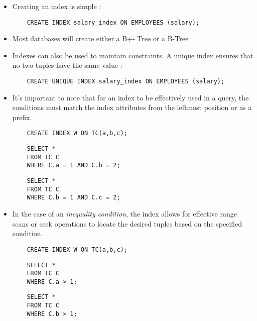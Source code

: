 \begin{itemize}
    \item Creating an index is simple :
    \begin{verbatim}
    CREATE INDEX salary_index ON EMPLOYEES (salary);
    \end{verbatim}
    \item Most databases will create either a B+- Tree or a B-Tree
    \item Indexes can also be used to maintain constraints. A unique index ensures that no two tuples have the same value :
    \begin{verbatim}
    CREATE UNIQUE INDEX salary_index ON EMPLOYEES (salary);
    \end{verbatim}
    \item It's important to note that for an index to be effectively used in a query, the conditions must match the index attributes from the leftmost position or as a prefix.
    \begin{verbatim}
    CREATE INDEX W ON TC(a,b,c);
    \end{verbatim}
    \begin{minipage}[t]{0.4\textwidth}
    \begin{verbatim}
    SELECT *
    FROM TC C
    WHERE C.a = 1 AND C.b = 2;
    \end{verbatim}
    \end{minipage}
    \hfill
    \begin{minipage}[t]{0.4\textwidth}
    \begin{verbatim}
    SELECT *
    FROM TC C
    WHERE C.b = 1 AND C.c = 2;
    \end{verbatim}
    \end{minipage}
    \item In the case of an \textit{inequality condition}, the index allows for effective range scans or seek operations to locate the desired tuples based on the specified condition.
    \begin{verbatim}
    CREATE INDEX W ON TC(a,b,c);
    \end{verbatim}
    \begin{minipage}[t]{0.4\textwidth}
    \begin{verbatim}
    SELECT *
    FROM TC C
    WHERE C.a > 1;
    \end{verbatim}
    \end{minipage}
    \hfill
    \begin{minipage}[t]{0.4\textwidth}
    \begin{verbatim}
    SELECT *
    FROM TC C
    WHERE C.b > 1;
    \end{verbatim}
    \end{minipage}
\end{itemize}

